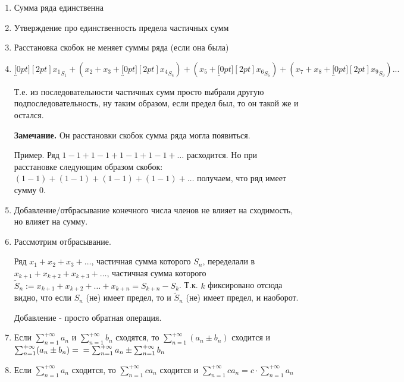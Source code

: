 \documentclass[12pt,letterpaper]{report}
\makeatletter
\renewenvironment{proof}[1][\proofname]{%
   \par\pushQED{\qed}\normalfont%
   \topsep6\p@\@plus6\p@\relax
   \trivlist\item[\hskip\labelsep\bfseries#1\@addpunct{.}]%
   \ignorespaces
}{%
   \popQED\endtrivlist\@endpefalse
}
\makeatother
\begin{document}
\begin{enumerate}
    \item Сумма ряда единственна
    
    \begin{proof}
        Утверждение про единственность предела частичных сумм
    \end{proof}

    \item Расстановка скобок не меняет суммы ряда (если она была)
    
    \begin{proof}
        $\underbracket[0pt][2pt]{x_1}_{S_1} + (x_2 + x_3 +
        \underbracket[0pt][2pt]{x_4}_{S_4}) + (x_5 + 
        \underbracket[0pt][2pt]{x_6}_{S_6}) + (x_7 + x_8 + 
        \underbracket[0pt][2pt]{x_9}_{S_9})...$

        Т.е. из последовательности частичных сумм просто выбрали
        другую подпоследовательность, ну таким образом, если предел был,
        то он такой же и остался.
    \end{proof}

    \textbf{Замечание.} Он расстановки скобок сумма ряда могла
    появиться.

    Пример. Ряд $1 - 1 + 1 - 1 + 1 - 1 + 1 - 1 + \dots$ расходится.
    Но при расстановке следующим образом скобок:
    $(1 - 1) + (1 - 1) + (1 - 1) + (1 - 1) + \dots$ получаем, что ряд
    имеет сумму $0$.

    \item Добавление/отбрасывание конечного числа членов не влияет на
    сходимость, но влияет на сумму.

    \begin{proof}
        Рассмотрим отбрасывание.

        Ряд $x_1 + x_2 + x_3 + \dots$, частичная сумма которого
        $S_n$, переделали в $x_{k+1} + x_{k+2} + x_{k+3} + \dots$,
        частичная сумма которого $\widetilde{S}_n := x_{k+1} + x_{k+2}
        + \dots + x_{k+n} = S_{k + n} - S_{k}$. Т.к. $k$ фиксировано
        отсюда видно, что если $S_n$ (не) имеет предел, то и
        $\widetilde{S}_n$ (не) имеет предел, и наоборот.

        Добавление - просто обратная операция.
    \end{proof}

    \item Если $\sum_{n = 1}^{+\infty} a_n$ и $\sum_{n = 1}^{+\infty} b_n$
    сходятся, то $\sum_{n = 1}^{+\infty} (a_n \pm b_n)$ сходится и
    $\sum_{n = 1}^{+\infty} (a_n \pm b_n) =\\= \sum_{n = 1}^{+\infty} a_n
    \pm \sum_{n = 1}^{+\infty} b_n$

    \item Если $\sum_{n = 1}^{+\infty} a_n$ сходится, то
    $\sum_{n = 1}^{+\infty} c a_n$ сходится и $\sum_{n = 1}^{+\infty} 
    c a_n = c \cdot \sum_{n = 1}^{+\infty} a_n$
    \end{enumerate}


\ifdefined\niveldos\else
\end{document}
